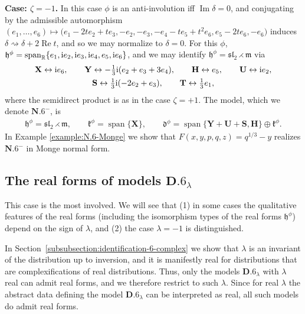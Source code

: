 \documentclass[10pt,a4paper]{amsart}
\DeclareMathOperator{\spanOperator}{span}
\renewcommand{\Im}{\operatorname{Im}}
\renewcommand{\Re}{\operatorname{Re}}
\newcommand{\Span}[1]{\spanOperator\{{#1}\}}
\newcommand{\bbR}{\mathbb{R}}
\newcommand{\mbH}{\mathbf{H}}
\newcommand{\mbS}{\mathbf{S}}
\newcommand{\mbT}{\mathbf{T}}
\newcommand{\mbU}{\mathbf{U}}
\newcommand{\mbX}{\mathbf{X}}
\newcommand{\mbY}{\mathbf{Y}}
\newcommand{\mfd} {\mathfrak{d}}
\newcommand{\mfh} {\mathfrak{h}}
\newcommand{\mfk} {\mathfrak{k}}
\newcommand{\mfm} {\mathfrak{m}}
\newcommand{\mfsl} {\mathfrak{sl}}
\numberwithin{equation}{section}
\begin{document}
\noindent \textbf{Case: $\zeta = - 1$.} In this case $\phi$ is an anti-involution iff $\Im \delta = 0$, and conjugating by the admissible automorphism $(e_1, \ldots, e_6) \mapsto \big(e_1 - 2 t e_2 + t e_3, -e_2, -e_3, -e_4 - t e_5 + t^2 e_6, e_5 - 2 t e_6, -e_6\big)$ induces $\delta \rightsquigarrow \delta + 2 \Re t$, and so we may normalize to $\delta = 0$. For this $\phi$, $\mfh^{\phi} = \spanOperator_{\bbR}\{e_1, {\rm i} e_2, {\rm i} e_3, {\rm i} e_4, e_5, {\rm i} e_6\}$, and we may identify $\mfh^{\phi} = \mfsl_2 \rightthreetimes \mfm$
via
\begin{gather*}
	\mbX \leftrightarrow {\rm i} e_6 , \qquad
	\mbY \leftrightarrow -\tfrac{1}{3} {\rm i} (e_2 + e_3 + 3 e_4) , \qquad
	\mbH \leftrightarrow e_5 , \qquad
	\mbU \leftrightarrow {\rm i} e_2 , \\
	\mbS \leftrightarrow \tfrac{1}{3} {\rm i} (-2 e_2 + e_3) , \qquad
	\mbT \leftrightarrow \tfrac{1}{3} e_1 ,
\end{gather*}
where the semidirect product is as in the case $\zeta = + 1$. The model, which we denote $\mathbf{N.6}^-$, is
\begin{gather*}
	\boxed{
 \mfh^{\phi} = \mfsl_2 \rightthreetimes \mfm , \qquad
		\mfk^{\phi} = \Span{\mbX} , \qquad
		\mfd^{\phi} = \Span{\mbY + \mbU + \mbS, \mbH} \oplus \mfk^{\phi} .
	}
\end{gather*}
In Example \ref{example:N.6-Monge} we show that $F(x, y, p, q, z) = q^{1 / 3} - y$ realizes $\mathbf{N.6}^-$ in Monge normal form.

\subsection{The real forms of models \texorpdfstring{$\mathbf{D.6}_{\lambda}$}{D.6-lambda}}\label{subsection:D.6-lambda-real}

This case is the most involved. We will see that (1) in some cases the qualitative features of the real forms (including the isomorphism types of the real forms $\mfh^{\phi}$) depend on the sign of $\lambda$, and (2) the case $\lambda = -1$ is distinguished.

In Section~\ref{subsubsection:identification-6-complex} we show that $\lambda$ is an invariant of the distribution up to inversion, and it is manifestly real for distributions that are complexifications of real distributions. Thus, only the models $\mathbf{D.6}_{\lambda}$ with $\lambda$ real can admit real forms, and we therefore restrict to such $\lambda$. Since for real $\lambda$ the abstract data defining the model $\mathbf{D.6}_{\lambda}$ can be interpreted as real, all such models do admit real forms.
\end{document}
